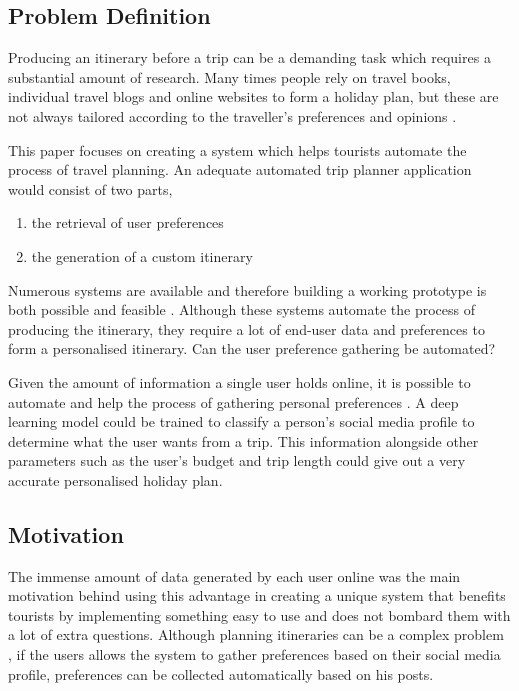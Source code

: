 \subsection{Problem Definition}

        Producing an itinerary before a trip can be a demanding task
        which requires  a substantial amount of  research. Many times
        people rely on travel books, individual travel blogs and
        online websites to form a holiday plan, but these are not
        always tailored according to the traveller’s preferences and
        opinions \cite{DeChoudhury2010}. 

        This paper focuses on creating a system which helps tourists
        automate the process of travel planning. An adequate automated
        trip planner application would consist of two parts, 
        
        \begin{enumerate}
                \item the retrieval of user preferences 
                \item the generation of a custom itinerary
        \end{enumerate}
        Numerous systems are available and therefore building a
        working prototype is both possible and feasible
        \cite{Sylejmani2017,Chang2016,Sylejmani2012,Sebastia2009a,
        Tumas2009,Kurata2013, RamalhoBrilhante2014,
        DeChoudhury2010,DUNSTALL2008a, DiBitonto2010a,Gavalas }.
        Although these systems automate the process of producing the
        itinerary, they require a lot of end-user data and preferences
        to form a personalised itinerary. Can the user preference
        gathering be automated?

        Given the amount of information a single user holds online, it
        is possible to automate and help the process of gathering
        personal preferences \cite{Buraya2017}. A deep learning model
        could be trained to classify a person's social media profile
        to determine what the user wants from a trip. This information
        alongside other parameters such as the user's budget and trip
        length could give out a very accurate personalised holiday
        plan.

\subsection{Motivation}

        The immense amount of data generated by each user online
        \cite{J.Clement2020} was the main motivation behind using this
        advantage in creating a unique system that benefits tourists
        by implementing something easy to use and does not bombard
        them with a lot of extra questions. Although planning
        itineraries can be a complex problem \cite{DUNSTALL2008a}, if
        the users allows the system to gather preferences based on
        their social media profile, preferences can be collected
        automatically based on his posts. 

